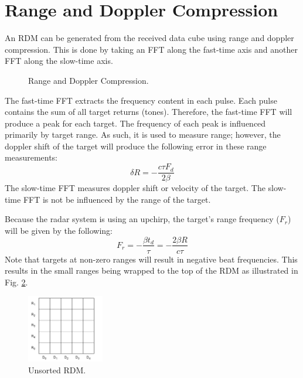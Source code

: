 \documentclass[conference]{IEEEtran}
\begin{document}
\section{Range and Doppler Compression}
An RDM can be generated from the received data cube using range and doppler compression. This is done by taking an FFT along the fast-time axis and another FFT along the slow-time axis.
\begin{figure}[H]
\centerline{}
\caption{Range and Doppler Compression.}
\label{RDM}
\end{figure}
\noindent
The fast-time FFT extracts the frequency content in each pulse. Each pulse contains the sum of all target returns (tones). Therefore, the fast-time FFT will produce a peak for each target. The frequency of each peak is influenced primarily by target range.
As such, it is used to measure range; however, the doppler shift of the target will produce the following error in these range measurements:
\begin{equation}
\delta R = -\frac{c\tau F_d}{2\beta}
\end{equation}
The slow-time FFT measures doppler shift or velocity of the target. The slow-time FFT is not be influenced by the range of the target.
\par
Because the radar system is using an upchirp, the target's range frequency ($F_r$) will be given by the following: 
\begin{equation}
F_r = -\frac{\beta t_d}{\tau} = -\frac{2\beta R}{c\tau}
\end{equation}
Note that targets at non-zero ranges will result in negative beat frequencies. This results in the small ranges being wrapped to the top of the RDM as illustrated in Fig. \ref{Unsorted_RDM}.
\begin{figure}[H]
\centerline{\includegraphics[width=0.3\textwidth]{Unsorted_RDM.png}}
\caption{Unsorted RDM.}
\label{Unsorted_RDM}
\end{figure}
\end{document}
